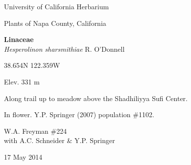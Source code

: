 \documentclass[letterpaper,10pt]{article}
\begin{document}
\begin{minipage}[t]{0.40\textwidth}

\begin{center}
University of California Herbarium \\
\begin{large}
Plants of Napa County, California \\
\end{large}
\vspace{\baselineskip}
\textbf{Linaceae} \\
\textit{Hesperolinon sharsmithiae} R. O'Donnell\\
\end{center}

\begin{footnotesize}

\begin{multicols}{2}
38.654\textdegree N 122.359\textdegree W
\columnbreak
\begin{flushright}
Elev. 331 m
\end{flushright}
\end{multicols}

Along trail up to meadow above the Shadhiliyya Sufi Center.
\vspace{\baselineskip}

In flower. Y.P. Springer (2007) population \#1102.

\begin{multicols}{2}
W.A. Freyman \#224 \\
with A.C. Schneider \& Y.P. Springer
\columnbreak
\begin{flushright}
17 May 2014
\end{flushright}
\end{multicols}

\end{footnotesize}

\end{minipage}

\vspace{2cm}
%
%

%
%
\end{document}
